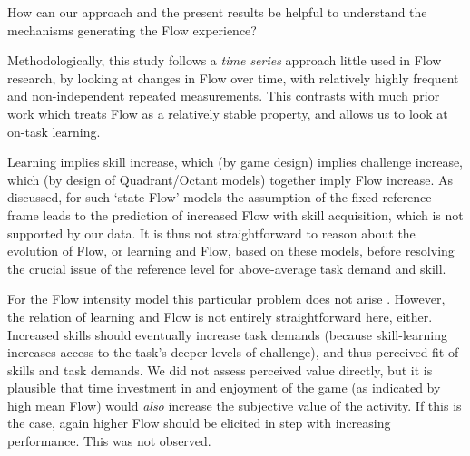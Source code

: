 \documentclass{frontierstyle/frontiersSCNS}
\begin{document}
How can our approach and the present results be helpful to understand the mechanisms generating the Flow experience?

Methodologically, this study follows a {\it time series} approach little used in Flow research, by looking at changes in Flow over time, with relatively highly frequent and non-independent repeated measurements. This contrasts with much prior work which treats Flow as a relatively stable property, and allows us to look at on-task learning.

Learning implies skill increase, which (by game design) implies challenge increase, which (by design of Quadrant/Octant models) together imply Flow increase. As discussed, for such `state Flow' models the assumption of the fixed reference frame leads to the prediction of increased Flow with skill acquisition, which is not supported by our data. It is thus not straightforward to reason about the evolution of Flow, or learning and Flow, based on these models, before resolving the crucial issue of the reference level for above-average task demand and skill.

For the Flow intensity model this particular problem does not arise \citep{Keller2012}. However, the relation of learning and Flow is not entirely straightforward here, either. Increased skills should eventually increase task demands (because skill-learning increases access to the task's deeper levels of challenge), and thus perceived fit of skills and task demands. We did not assess perceived value directly, but it is plausible that time investment in and enjoyment of the game (as indicated by high mean Flow) would {\it also} increase the subjective value of the activity. If this is the case, again higher Flow should be elicited in step with increasing performance. This was not observed.





\end{document}
